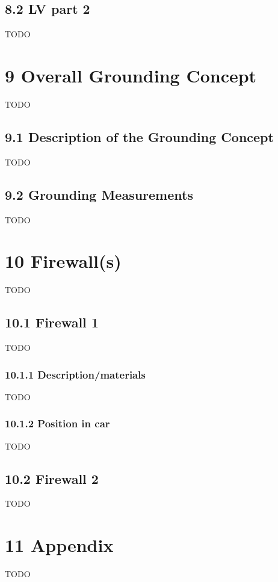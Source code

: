 \documentclass{article}
\begin{document}
\subsection*{8.2 LV part 2}
TODO

\section*{9 Overall Grounding Concept}
TODO

\subsection*{9.1 Description of the Grounding Concept}
TODO

\subsection*{9.2 Grounding Measurements}
TODO

\section*{10 Firewall(s)}
TODO

\subsection*{10.1 Firewall 1}
TODO

\subsubsection*{10.1.1 Description/materials}
TODO

\subsubsection*{10.1.2 Position in car}
TODO

\subsection*{10.2 Firewall 2}
TODO

\section*{11 Appendix}
TODO
\end{document}
